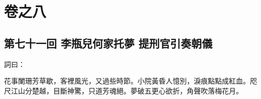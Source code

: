 \part*{{\titlename}卷之八}



\chapter*{第七十一回 李瓶兒何家托夢 提刑官引奏朝儀}


詞曰：

\begin{myquote}
花事闌珊芳草歇，客裡風光，又過些時節。小院黃昏人憶別，淚痕點點成紅血。咫尺江山分楚越，目斷神驚，只道芳魂絕。夢破五更心欲折，角聲吹落梅花月。

\end{myquote}

